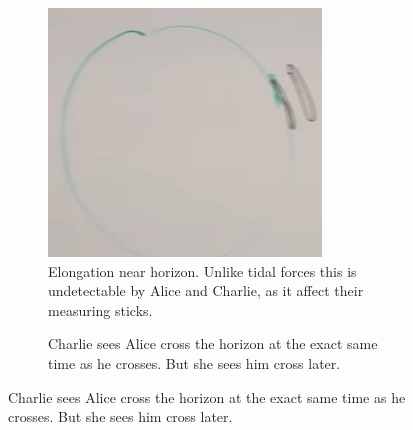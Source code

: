 \documentclass[]{article}
\begin{document}
{\begin{figure}[H]
	\caption{Alice and Charlie at the Event Horizon}
	\begin{subfigure}[t]{0.3\textwidth}
		\caption{Elongation near horizon. Unlike tidal forces this is undetectable by Alice and Charlie, as it affect their measuring sticks.}\label{fig:gr-6-elongation}
		\includegraphics[width=\textwidth]{gr-6-elongation}
	\end{subfigure}
	\;
	\begin{subfigure}[t]{0.3\textwidth}
		\caption{Charlie sees Alice cross the horizon at the exact same time as he crosses. But she sees him cross later.}\label{fig:gr-7-alice-charlie-crossing-horizon}

\end{subfigure}
\end{figure}}
\end{document}

